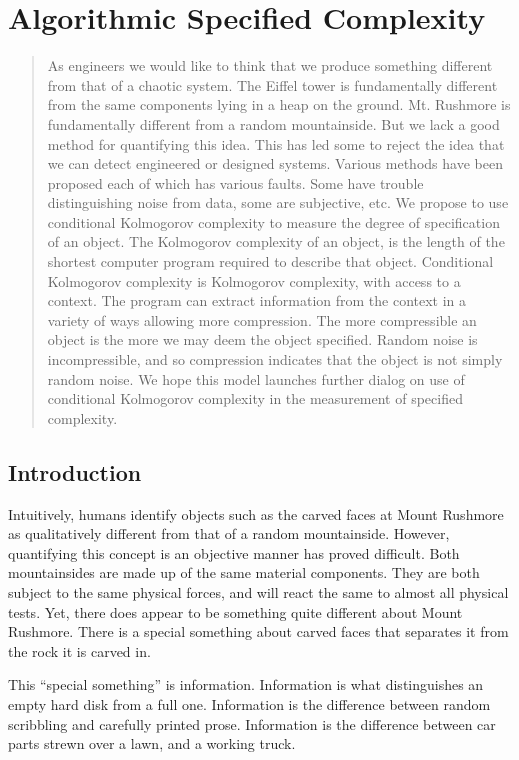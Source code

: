 \chapter{Algorithmic Specified Complexity}
\author{Winston Ewert, William A. Dembski, and Robert J. Marks II}

\begin{abstract}
As engineers we would like to think that we produce something different from that of a chaotic system. The Eiffel tower is  fundamentally different from the same components lying in a heap on the ground. Mt. Rushmore is fundamentally  different from a random mountainside. But we lack a good method for quantifying this idea. This has led some to reject the idea that we can detect engineered or designed systems. Various methods have been proposed each of which has
various faults. Some have trouble distinguishing noise from data, some are subjective, etc. We propose to use conditional Kolmogorov complexity to measure the degree of specification of an object. The Kolmogorov complexity of an object, is the length of the shortest computer program required to describe that object. Conditional Kolmogorov complexity is Kolmogorov complexity, with access to a  context. The program can extract information from the context in a variety of ways allowing more compression. The more compressible an object is the more we may deem the object specified. Random noise is  incompressible, and so compression indicates that the object is not simply random noise. 
We hope this model launches further dialog on use of conditional Kolmogorov complexity in the measurement of specified complexity.
\end{abstract}

\section{Introduction}

Intuitively, humans identify objects such as the carved faces at Mount Rushmore as qualitatively different from that of a random mountainside.
However, quantifying this concept is an objective manner has proved difficult.
Both mountainsides are made up of the same material components.
They are both subject to the same physical forces, and will react the same to almost all physical tests.
Yet, there does appear to be something quite different about Mount Rushmore.
There is a special something about carved faces that separates it from the rock it is carved in.

This ``special something'' is information.
Information is what distinguishes an empty hard disk from a full one.
Information is the difference between random scribbling and carefully printed prose.
Information is the difference between car parts strewn over a lawn, and a working truck.

